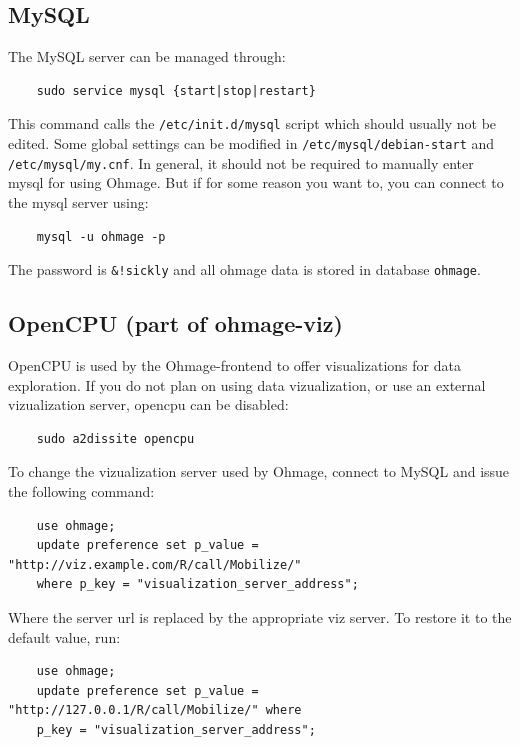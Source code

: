 \documentclass{scrartcl}
\begin{document}
\subsection{MySQL}

The MySQL server can be managed through:

\begin{verbatim}
    sudo service mysql {start|stop|restart}
\end{verbatim}

\noindent This command calls the \texttt{/etc/init.d/mysql} script which should
usually not be edited. Some global settings can be modified in
\texttt{/etc/mysql/debian-start} and \texttt{/etc/mysql/my.cnf}. In general, it
should not be required to manually enter mysql for using Ohmage. But if for some
reason you want to, you can connect to the mysql server using:

\begin{verbatim}
    mysql -u ohmage -p
\end{verbatim}
The password is \texttt{\&!sickly} and all ohmage data is stored in database
\texttt{ohmage}.

\subsection{OpenCPU (part of ohmage-viz)}

OpenCPU is used by the Ohmage-frontend to offer visualizations for data
exploration. If you do not plan on using data vizualization, or use an
external vizualization server, opencpu can be disabled:

\begin{verbatim}
    sudo a2dissite opencpu
\end{verbatim}
To change the vizualization server used by Ohmage, connect to MySQL and issue
the following command:

\begin{verbatim}
    use ohmage;
    update preference set p_value = "http://viz.example.com/R/call/Mobilize/"
    where p_key = "visualization_server_address";
\end{verbatim}
Where the server url is replaced by the appropriate viz server. To
restore it to the default value, run:

\begin{verbatim}
    use ohmage;
    update preference set p_value = "http://127.0.0.1/R/call/Mobilize/" where
    p_key = "visualization_server_address";
\end{verbatim}
\end{document}
